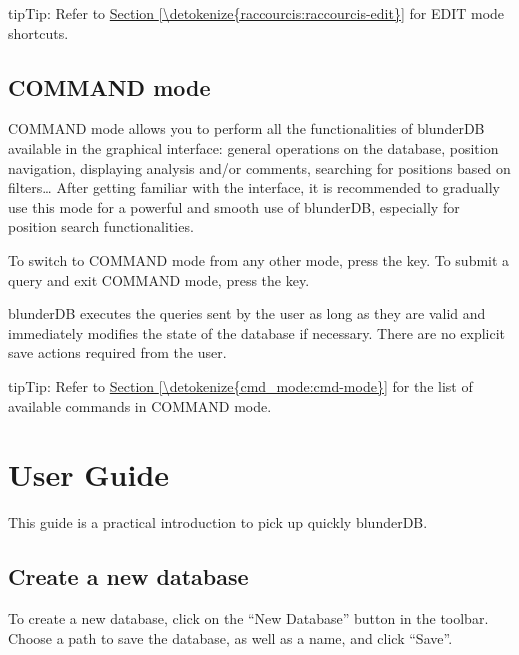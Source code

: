 \documentclass[letterpaper,10pt,english]{sphinxmanual}
\begin{document}
\begin{sphinxadmonition}{tip}{Tip:}
\sphinxAtStartPar
Refer to \hyperref[\detokenize{raccourcis:raccourcis-edit}]{Section \ref{\detokenize{raccourcis:raccourcis-edit}}} for EDIT mode shortcuts.
\end{sphinxadmonition}


\subsection{COMMAND mode}
\label{\detokenize{manuel:le-mode-command}}\label{\detokenize{manuel:mode-command}}
\sphinxAtStartPar
COMMAND mode allows you to perform all the functionalities of blunderDB available in the graphical interface: general operations on the database, position navigation, displaying analysis and/or comments, searching for positions based on filters… After getting familiar with the interface, it is recommended to gradually use this mode for a powerful and smooth use of blunderDB, especially for position search functionalities.

\sphinxAtStartPar
To switch to COMMAND mode from any other mode, press the  key. To submit a query and exit COMMAND mode, press the  key.

\sphinxAtStartPar
blunderDB executes the queries sent by the user as long as they are valid and immediately modifies the state of the database if necessary. There are no explicit save actions required from the user.

\begin{sphinxadmonition}{tip}{Tip:}
\sphinxAtStartPar
Refer to \hyperref[\detokenize{cmd_mode:cmd-mode}]{Section \ref{\detokenize{cmd_mode:cmd-mode}}} for the list of available commands in COMMAND mode.
\end{sphinxadmonition}

\sphinxstepscope


\section{User Guide}
\label{\detokenize{guide_utilisateur:guide-utilisateur}}\label{\detokenize{guide_utilisateur:id1}}\label{\detokenize{guide_utilisateur::doc}}
\sphinxAtStartPar
This guide is a practical introduction to pick up quickly blunderDB.


\subsection{Create a new database}
\label{\detokenize{guide_utilisateur:creer-une-nouvelle-base-de-donnees}}
\sphinxAtStartPar
To create a new database, click on the “New Database” button in the toolbar. Choose a path to save the database, as well as a name, and click “Save”.
\end{document}
